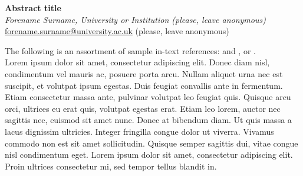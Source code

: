 \documentclass[12pt,a4paper]{article}
\begin{document}
\raggedbottom
\begin{center}
\textbf{Abstract title}\\
\vspace{0.5em}
\emph{Forename Surname, University or Institution (please, leave anonymous)}\\
\vspace{0.25em}
\href{mailto:forename.surname@university.ac.uk}{forename.surname@university.ac.uk} (please, leave anonymous)
\end{center}
The following is an assortment of sample in-text references: \cite{Walkden2014} and \cite{Kauhanen2017}, or \citep{Bermudez-Otero2007,Turton2014,Kauhanen2017,Nini2017,Walkden2014}.\\

Lorem ipsum dolor sit amet, consectetur adipiscing elit. Donec diam nisl, condimentum vel mauris ac, posuere porta arcu. Nullam aliquet urna nec est suscipit, et volutpat ipsum egestas. Duis feugiat convallis ante in fermentum. Etiam consectetur massa ante, pulvinar volutpat leo feugiat quis. Quisque arcu orci, ultrices eu erat quis, volutpat egestas erat. Etiam leo lorem, auctor nec sagittis nec, euismod sit amet nunc. Donec at bibendum diam. Ut quis massa a lacus dignissim ultricies. Integer fringilla congue dolor ut viverra. Vivamus commodo non est sit amet sollicitudin. Quisque semper sagittis dui, vitae congue nisl condimentum eget. Lorem ipsum dolor sit amet, consectetur adipiscing elit. Proin ultrices consectetur mi, sed tempor tellus blandit in.
\end{document}
